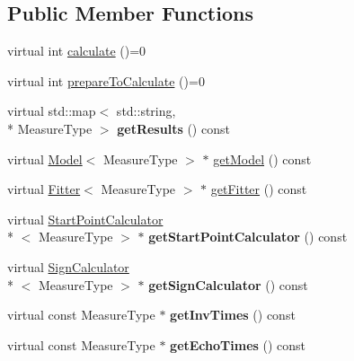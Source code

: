 \subsection*{Public Member Functions}
\begin{DoxyCompactItemize}
\item 
virtual int \hyperlink{class_ox_1_1_calculator_a9638894f2ec526b68f46f02122bae0c3}{calculate} ()=0
\item 
virtual int \hyperlink{class_ox_1_1_calculator_a01267c4e842b35f7eacaa9aacdd7e766}{prepare\-To\-Calculate} ()=0
\item 
\hypertarget{class_ox_1_1_calculator_a4b04d48cb906764aa235c387b631dca4}{virtual std\-::map$<$ std\-::string, \\*
Measure\-Type $>$ {\bfseries get\-Results} () const }\label{class_ox_1_1_calculator_a4b04d48cb906764aa235c387b631dca4}

\item 
virtual \hyperlink{class_ox_1_1_model}{Model}$<$ Measure\-Type $>$ $\ast$ \hyperlink{class_ox_1_1_calculator_a5589bf7b93a2d1e106532c35745f4329}{get\-Model} () const 
\item 
virtual \hyperlink{class_ox_1_1_fitter}{Fitter}$<$ Measure\-Type $>$ $\ast$ \hyperlink{class_ox_1_1_calculator_af648a7c6c957c9f51532f15c93147d62}{get\-Fitter} () const 
\item 
\hypertarget{class_ox_1_1_calculator_ad43fbbb3e888e1fa73f95d872a963bac}{virtual \hyperlink{class_ox_1_1_start_point_calculator}{Start\-Point\-Calculator}\\*
$<$ Measure\-Type $>$ $\ast$ {\bfseries get\-Start\-Point\-Calculator} () const }\label{class_ox_1_1_calculator_ad43fbbb3e888e1fa73f95d872a963bac}

\item 
\hypertarget{class_ox_1_1_calculator_a4ee7fdeb4009d2e433ef6a566768eb25}{virtual \hyperlink{class_ox_1_1_sign_calculator}{Sign\-Calculator}\\*
$<$ Measure\-Type $>$ $\ast$ {\bfseries get\-Sign\-Calculator} () const }\label{class_ox_1_1_calculator_a4ee7fdeb4009d2e433ef6a566768eb25}

\item 
\hypertarget{class_ox_1_1_calculator_ab844b24dfedd27d52466203ec0c913fa}{virtual const Measure\-Type $\ast$ {\bfseries get\-Inv\-Times} () const }\label{class_ox_1_1_calculator_ab844b24dfedd27d52466203ec0c913fa}

\item 
\hypertarget{class_ox_1_1_calculator_a6a46eb89732759c2544398f9a694f5c7}{virtual const Measure\-Type $\ast$ {\bfseries get\-Echo\-Times} () const }\label{class_ox_1_1_calculator_a6a46eb89732759c2544398f9a694f5c7}


\end{DoxyCompactItemize}
